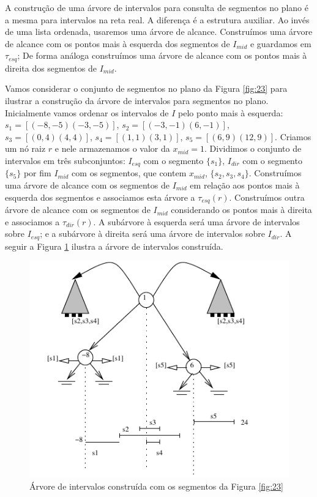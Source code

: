 A construção de uma árvore de intervalos para consulta de segmentos no plano é a mesma para intervalos na reta real. A diferença é a estrutura auxiliar. Ao invés de uma lista ordenada, usaremos uma árvore de alcance. Construímos uma árvore de alcance com os pontos mais à esquerda dos segmentos de $I_{mid}$ e guardamos em $\tau_{esq}$; De forma análoga construímos uma árvore de alcance com os pontos mais à direita dos segmentos de $I_{mid}$.

Vamos considerar o conjunto de segmentos no plano da Figura \ref{fig:23} para ilustrar a construção da árvore de intervalos para segmentos no plano.
Inicialmente vamos ordenar os intervalos de $I$ pelo ponto mais à esquerda: $s_1 = [(-8,-5)(-3,-5)]$, $s_2 =[(-3,-1)(6, -1)]$, $s_3 = [(0,4)(4,4)]$, $s_4 =[(1,1)(3,1)]$, $s_5 = [(6,9)(12,9)]$. Criamos um nó raiz $r$ e nele armazenamos o valor da $x_{mid}  = 1$. Dividimos o conjunto de intervalos em três subconjuntos: $I_{esq}$ com o segmento $\{s_1\}$, $I_{dir}$ com o segmento $\{s_5\}$ por fim $I_{mid}$ com os segmentos, que contem $x_{mid}$, $\{ s_2, s_3, s_4\}$. Construímos uma árvore de alcance com os segmentos de $I_{mid}$ em relação aos pontos mais à esquerda dos segmentos e associamos esta árvore a $\tau_{esq}(r)$. Construímos outra árvore de alcance com os segmentos de $I_{mid}$ considerando os pontos mais à direita e associamos a $\tau_{dir}(r)$. A subárvore à esquerda será uma árvore de intervalos sobre $I_{esq}$; e a subárvore à direita será uma árvore de intervalos sobre $I_{dir}$. A seguir a Figura \ref{fig:24} ilustra a árvore de intervalos construída.

\begin{figure}[h!]
    \begin{center}
        \includegraphics[scale=1.5]{images/interval_tree9.pdf}
    \end{center}
    \caption{ Árvore de intervalos construída com os segmentos da Figura \ref{fig:23}}
    \label{fig:24}
\end{figure}


